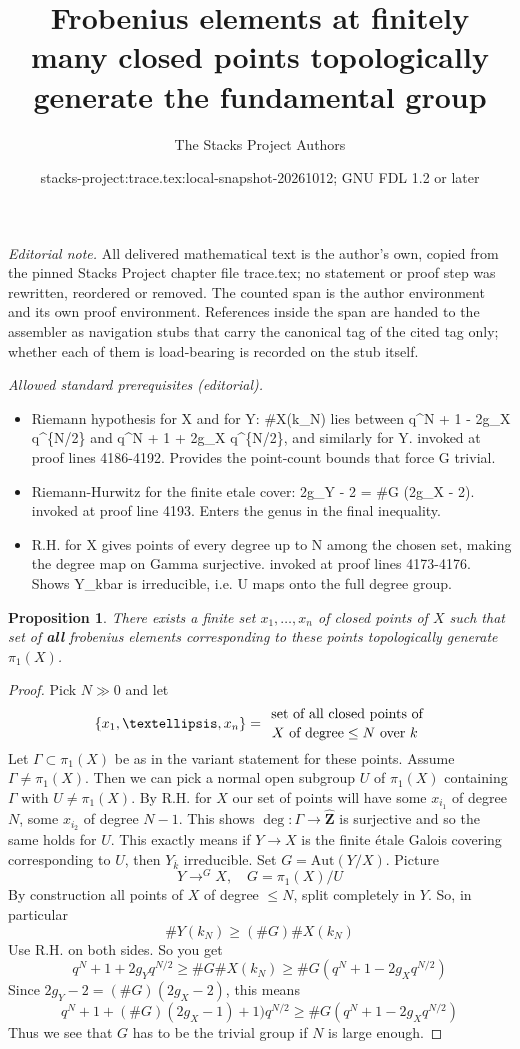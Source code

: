 \documentclass{stacks-project}
\title{Frobenius elements at finitely many closed points topologically generate the fundamental group}
\author{The Stacks Project Authors}
\date{stacks-project:trace.tex:local-snapshot-20261012; GNU FDL 1.2 or later}
\theoremstyle{plain}
\newtheorem{proposition}[subsection]{Proposition}
\theoremstyle{definition}
\theoremstyle{remark}
\numberwithin{equation}{subsection}
\begin{document}
\maketitle
\setcounter{subsection}{1}
\noindent\textit{Editorial note.} All delivered mathematical text is the author's own, copied from the pinned Stacks Project chapter file trace.tex; no statement or proof step was rewritten, reordered or removed. The counted span is the author environment and its own proof environment. References inside the span are handed to the assembler as navigation stubs that carry the canonical tag of the cited tag only; whether each of them is load-bearing is recorded on the stub itself.\par\medskip
\noindent\textit{Allowed standard prerequisites (editorial).}\begin{itemize}
\item Riemann hypothesis for X and for Y: \#X(k\_N) lies between q\textasciicircum{}N + 1 - 2g\_X q\textasciicircum{}\{N/2\} and q\textasciicircum{}N + 1 + 2g\_X q\textasciicircum{}\{N/2\}, and similarly for Y. invoked at proof lines 4186-4192. Provides the point-count bounds that force G trivial.
\item Riemann-Hurwitz for the finite etale cover: 2g\_Y - 2 = \#G (2g\_X - 2). invoked at proof line 4193. Enters the genus in the final inequality.
\item R.H. for X gives points of every degree up to N among the chosen set, making the degree map on Gamma surjective. invoked at proof lines 4173-4176. Shows Y\_kbar is irreducible, i.e. U maps onto the full degree group.
\end{itemize}\medskip
\begin{proposition}
\label{proposition-finite-set-frobenii-generate-topologically}
There exists a finite set $x_1, \ldots, x_n$ of closed points of $X$
such that set of {\bf all} frobenius elements corresponding to these
points topologically generate $\pi_1(X)$.
\end{proposition}

\begin{proof}
Pick $N\gg 0$ and let
$$
\{x_1, \ldots, x_n\} =
{\text{ set of all closed points of}
\atop X \text{ of degree} \leq N\text{ over } k}
$$
Let $\Gamma\subset \pi_1(X)$ be as in the variant statement for these
points. Assume $\Gamma \neq \pi_1(X)$. Then we can pick a normal open
subgroup $U$ of $\pi_1(X)$ containing $\Gamma$ with
$U \neq \pi_1(X)$. By R.H. for $X$ our set of points will have some
$x_{i_1}$ of degree $N$, some $x_{i_2}$ of degree $N - 1$. This shows
$\deg : \Gamma \to \widehat{\mathbf{Z}}$ is surjective
and so the same holds for $U$. This exactly
means if $Y \to X$ is the finite \'etale Galois covering
corresponding to $U$, then $Y_{\overline{k}}$ irreducible.
Set $G = \text{Aut}(Y/X)$. Picture
$$
Y \to^G X,\quad G = \pi_1(X)/U
$$
By construction all points of $X$ of degree $\leq N$, split
completely in $Y$. So, in particular
$$
\# Y(k_N)\geq (\# G)\# X(k_N)
$$
Use R.H. on both sides. So you get
$$
q^N+1+2g_Yq^{N/2}\geq \# G\# X(k_N)\geq \#
G(q^N+1-2g_Xq^{N/2})
$$
Since $2g_Y-2 = (\# G)(2g_X-2)$, this means
$$
q^N + 1 + (\# G)(2g_X - 1) + 1)q^{N/2}\geq
\# G (q^N + 1 - 2g_Xq^{N/2})
$$
Thus we see that $G$ has to be the trivial group if $N$ is large enough.
\end{proof}
\end{document}
